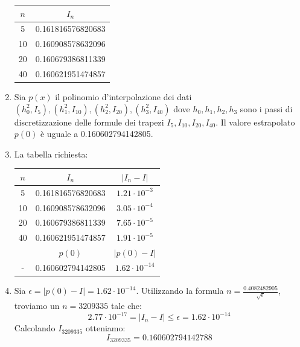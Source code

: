 \documentclass[a4paper,12pt]{article}
\begin{document}
\begin{enumerate}[label=(\alph*)]
\begin{table}[H]
  \begin{center}
    \begin{tabular}{c|c} 
      $n$ & $I_n$ \\
      \hline
    5 &   0.161816576820683\\
    10 &   0.160908578632096\\
    20  &  0.160679386811339\\
    40  &  0.160621951474857  \\   
         \end{tabular}
  \end{center}
\end{table}
\item  Sia $p(x)$ il polinomio d’interpolazione dei dati $(h^2_0, I_5),(h^2_1, I_{10}),(h^2_2, I_{20}),(h^2_3, I_{40}) $ dove
$h_0, h_1, h_2, h_3$ sono i passi di discretizzazione delle formule dei trapezi $I_5, I_{10}, I_{20}, I_{40}$. Il valore estrapolato $p(0)$ è uguale a 0.160602794142805.
\item La tabella richiesta: 
\begin{table}[H]
  \begin{center}
    \begin{tabular}{c|c|c}
      
     $n$ & $I_n$ & $|I_n-I|$ \\
      \hline
     5 & 0.161816576820683  &   $1.21\cdot10^{-3}$\\
    10 & 0.160908578632096  &  $3.05\cdot10^{-4}$\\
    20 & 0.160679386811339  &   $7.65\cdot10^{-5}$\\
    40 & 0.160621951474857  &  $1.91\cdot10^{-5}$\\
	   & $p(0)$ & $|p(0)-I|$\\
      \hline
    - &  0.160602794142805  &  $1.62\cdot10^{-14}$\\
      
    \end{tabular}
  \end{center}
\end{table}

\item Sia $\epsilon=|p(0)-I|=1.62\cdot10^{-14}$. Utilizzando la formula $n=\frac{0.4082482905}{\sqrt{\epsilon}}$, troviamo un $n=3209335$ tale che: 
\begin{equation*}
2.77\cdot10^{-17}=|I_n-I|\leq\epsilon=1.62\cdot10^{-14}
\end{equation*}
Calcolando $I_{3209335}$ otteniamo:
\begin{equation*}
I_{3209335} =  0.160602794142788
\end{equation*}
\end{enumerate}
\end{document}
